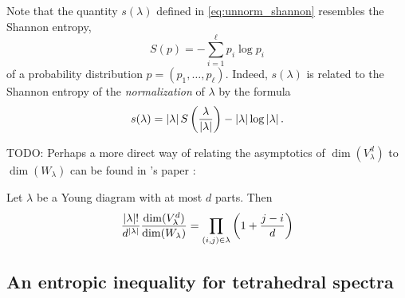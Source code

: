 \documentclass[notitlepage, 10pt]{article}
\begin{document}
\begin{rem}
    Note that the quantity $s(\lambda)$ defined in \cref{eq:unnorm_shannon} resembles the Shannon entropy,
    \begin{equation}
        S(p) = -\sum_{i=1}^{\ell} p_i \log p_i
    \end{equation}
    of a probability distribution $p = (p_1, \ldots, p_\ell)$.
    Indeed, $s(\lambda)$ is related to the Shannon entropy of the \textit{normalization} of $\lambda$ by the formula
    \begin{equation}
        \label{eq:little_s_relation}
        s(\lambda) = \left|\lambda\right| S\left(\frac{\lambda}{\left|\lambda\right|}\right) - \left|\lambda\right| \log \left|\lambda\right|.
    \end{equation}
\end{rem}

{\color{red}
TODO: Perhaps a more direct way of relating the asymptotics of $\dim(V_{\lambda}^{d})$ to $\dim(W_{\lambda})$ can be found in \citeauthor{harrow2023approximate}'s paper \cite[Lemma 2]{harrow2023approximate}:
}
\begin{lem}
    Let $\lambda$ be a Young diagram with at most $d$ parts. Then
    \begin{equation}
        \frac{\left|\lambda\right|!}{d^{\left|\lambda\right|}} \frac{\dim(V_{\lambda}^{d})}{\dim(W_{\lambda})} = \prod_{(i,j) \in \lambda} \left(1 + \frac{j-i}{d}\right)
    \end{equation}
\end{lem}



\subsection{An entropic inequality for tetrahedral spectra}
\end{document}
